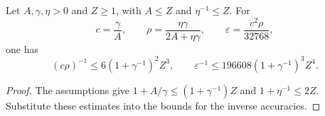\begin{lemma}
    \label{lem:viable_refinement_costs_le_polynomial}
    \leanok
    Let $A,\gamma,\eta>0$ and $Z\ge1$, with $A\le Z$ and
    $\eta^{-1}\le Z$. For
    \[
        c=\frac\gamma A,\qquad
        \rho=\frac{\eta\gamma}{2A+\eta\gamma},\qquad
        \varepsilon=\frac{c^2\rho}{32768},
    \]
    one has
    \[
        (c\rho)^{-1}\le6(1+\gamma^{-1})^2 Z^3,
        \qquad
        \varepsilon^{-1}\le196608(1+\gamma^{-1})^3 Z^4.
    \]
\end{lemma}
\begin{proof}\leanok
    The assumptions give $1+A/\gamma\le(1+\gamma^{-1})Z$
    and $1+\eta^{-1}\le2Z$. Substitute these estimates into the
    bounds for the inverse accuracies.
\end{proof}
